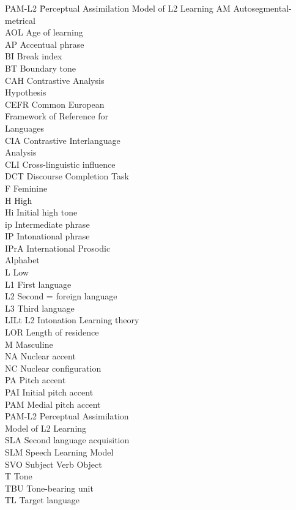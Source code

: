\addchap{\lsAbbreviationsTitle}
\begin{multicols}{2}
\begin{tabbing}
PAM-L2  \=  Perceptual Assimilation Model of L2 Learning\kill
AM   \>   Autosegmental-metrical\\
AOL  \>    Age of learning\\
AP  \>    Accentual phrase\\
BI   \>   Break index\\
BT  \>    Boundary tone\\
CAH  \>    Contrastive Analysis \\ \> Hypothesis\\
CEFR  \>    Common European \\ \> Framework  of Reference for  \\ \>Languages\\
CIA   \>   Contrastive Interlanguage \\ \> Analysis\\
CLI   \>   Cross-linguistic influence\\
DCT  \>    Discourse Completion Task\\
F  \>    Feminine\\
H  \>    High\\
Hi  \>    Initial high tone\\
ip  \>    Intermediate phrase\\
IP   \>   Intonational phrase\\
IPrA  \>     International Prosodic \\ \>Alphabet\\
L   \>   Low\\
L1  \>    First language \\
L2   \>   Second = foreign language\\
L3  \>    Third language\\
LILt  \>    L2 Intonation Learning theory\\
LOR  \>    Length of residence\\
M   \>   Masculine\\
NA  \>    Nuclear accent\\
NC   \>   Nuclear configuration\\
PA   \>   Pitch accent\\
PAI  \>    Initial pitch accent\\
PAM   \>   Medial pitch accent\\
PAM-L2  \>  Perceptual Assimilation \\ \> Model of L2 Learning\\
SLA  \>    Second language acquisition\\
SLM  \>    Speech Learning Model\\
SVO   \>   Subject Verb Object\\
T  \>     Tone\\
TBU  \>    Tone-bearing unit\\
TL  \>    Target language
\end{tabbing}
\end{multicols}

